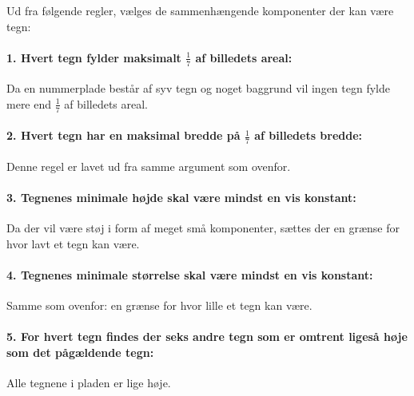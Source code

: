 


Ud fra følgende regler, vælges de sammenhængende komponenter der kan være tegn:

\paragraph{1. Hvert tegn fylder maksimalt $\frac{1}{7}$ af billedets areal:} Da en nummerplade består af syv tegn og noget baggrund vil ingen tegn fylde mere end $\frac{1}{7}$ af billedets areal. 
\paragraph{2. Hvert tegn har en maksimal bredde på $\frac{1}{7}$ af billedets bredde:} Denne regel er lavet ud fra samme argument som ovenfor.
\paragraph{3. Tegnenes minimale højde skal være mindst en vis konstant:} Da der vil være støj i form af meget små komponenter, sættes der en grænse for hvor lavt et tegn kan være.%
\paragraph{4. Tegnenes minimale størrelse skal være mindst en vis konstant:} Samme som ovenfor: en grænse for hvor lille et tegn kan være.%
\paragraph{5. For hvert tegn findes der seks andre tegn som er omtrent ligeså høje som det pågældende tegn:} Alle tegnene i pladen er lige høje.
